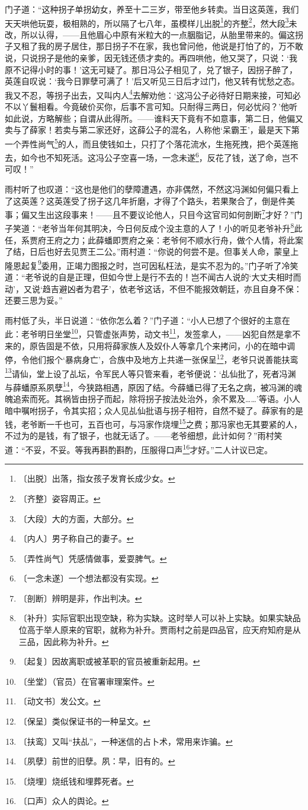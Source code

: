\documentclass[12pt,UTF-8,openany]{ctexbook}
\begin{document}
\begin{normalsize}
    门子道：“这种拐子单拐幼女，养至十二三岁，带至他乡转卖。当日这英莲，我们天天哄他玩耍，极相熟的，所以隔了七八年，虽模样儿出脱\footnote{〔出脱〕出落，指女孩子发育长成少女。}的齐整\footnote{〔齐整〕姿容周正。}，然大段\footnote{〔大段〕大的方面，大部分。}未改，所以认得，——且他眉心中原有米粒大的一点胭脂记，从胎里带来的。偏这拐子又租了我的房子居住，那日拐子不在家，我也曾问他，他说是打怕了的，万不敢说，只说拐子是他的亲爹，因无钱还债才卖的。再四哄他，他又哭了，只说：‘我原不记得小时的事！’这无可疑了。那日冯公子相见了，兑了银子，因拐子醉了，英莲自叹说：‘我今日罪孽可满了！’后又听见三日后才过门，他又转有忧愁之态。我又不忍，等拐子出去，又叫内人\footnote{〔内人〕男子称自己的妻子。}去解劝他：‘这冯公子必待好日期来接，可知必不以丫鬟相看。今竟破价买你，后事不言可知。只耐得三两日，何必忧闷？’他听如此说，方略解些；自谓从此得所。——谁料天下竟有不如意事，第二日，他偏又卖与了薛家！若卖与第二家还好，这薛公子的混名，人称他‘呆霸王’，最是天下第一个弄性尚气\footnote{〔弄性尚气〕凭感情做事，爱耍脾气。}的人，而且使钱如土，只打了个落花流水，生拖死拽，把个英莲拖去，如今也不知死活。这冯公子空喜一场，一念未遂\footnote{〔一念未遂〕一个想法都没有实现。}，反花了钱，送了命，岂不可叹！”
    
    雨村听了也叹道：“这也是他们的孽障遭遇，亦非偶然，不然这冯渊如何偏只看上了这英莲？这英莲受了拐子这几年折磨，才得了个路头，若果聚合了，倒是件美事；偏又生出这段事来！——且不要议论他人，只目今这官司如何剖断\footnote{〔剖断〕辨明是非，作出判决。}才好？”门子笑道：“老爷当年何其明决，今日何反成个没主意的人了！小的听见老爷补升\footnote{〔补升〕实际官职出现空缺，称为实缺。这时举人可以补上实缺。如果实缺品位高于举人原来的官职，就称为补升。贾雨村之前是四品官，应天府知府是从三品，因此称为补升。}此任，系贾府王府之力；此薛蟠即贾府之亲：老爷何不顺水行舟，做个人情，将此案了结，日后也好去见贾王二公。”雨村道：“你说的何尝不是。但事关人命，蒙皇上隆恩起复\footnote{〔起复〕因故离职或被革职的官员被重新起用。}委用，正竭力图报之时，岂可因私枉法，是实不忍为的。”门子听了冷笑道：“老爷说的自是正理，但如今世上是行不去的！岂不闻古人说的‘大丈夫相时而动’，又说‘趋吉避凶者为君子’，依老爷这话，不但不能报效朝廷，亦且自身不保：还要三思为妥。”
    
    雨村低了头，半日说道：“依你怎么着？”门子道：“小人已想了个很好的主意在此：老爷明日坐堂\footnote{〔坐堂〕（官员）在官署审理案件。}，只管虚张声势，动文书\footnote{〔动文书〕发公文。}，发签拿人，——凶犯自然是拿不来的，原告固是不依，只用将薛家族人及奴仆人等拿几个来拷问，小的在暗中调停，令他们报个‘暴病身亡’，合族中及地方上共递一张保呈\footnote{〔保呈〕类似保证书的一种呈文。}，老爷只说善能扶鸾\footnote{〔扶鸾〕又叫“扶乩”，一种迷信的占卜术，常用来诈骗。}请仙，堂上设了乩坛，令军民人等只管来看，老爷便说：‘乩仙批了，死者冯渊与薛蟠原系夙孽\footnote{〔夙孽〕前世的旧孽。夙：早，旧有的。}，今狭路相遇，原因了结。今薛蟠已得了无名之病，被冯渊的魂魄追索而死。其祸皆由拐子而起，除将拐子按法处治外，余不累及……’等语。小人暗中嘱咐拐子，令其实招；众人见乩仙批语与拐子相符，自然不疑了。薛家有的是钱，老爷断一千也可，五百也可，与冯家作烧埋\footnote{〔烧埋〕烧纸钱和埋葬死者。}之费；那冯家也无其要紧的人，不过为的是钱，有了银子，也就无话了。——老爷细想，此计如何？”雨村笑道：“不妥，不妥。等我再斟酌斟酌，压服得口声\footnote{〔口声〕众人的舆论。}才好。”二人计议已定。
    

\end{normalsize}
\end{document}
